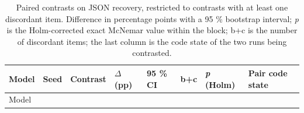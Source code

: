 \begin{landscape}
\begingroup\scriptsize\setlength{\tabcolsep}{1pt}\sloppy
\begin{longtable}[]{@{}
  >{\raggedright\arraybackslash}p{}
  >{\raggedleft\arraybackslash}p{}
  >{\raggedright\arraybackslash}p{}
  >{\raggedleft\arraybackslash}p{}
  >{\raggedright\arraybackslash}p{}
  >{\raggedleft\arraybackslash}p{}
  >{\raggedleft\arraybackslash}p{}
  >{\raggedright\arraybackslash}p{}@{}}
\caption{Paired contrasts on JSON recovery, restricted to contrasts with at least one discordant item. Difference in percentage points with a 95 \% bootstrap interval; \emph{p} is the Holm-corrected exact McNemar value within the block; b+c is the number of discordant items; the last column is the code state of the two runs being contrasted.}\tabularnewline
\toprule\noalign{}
\begin{minipage}[b]{\linewidth}\raggedright
Model
\end{minipage} & \begin{minipage}[b]{\linewidth}\raggedleft
Seed
\end{minipage} & \begin{minipage}[b]{\linewidth}\raggedright
Contrast
\end{minipage} & \begin{minipage}[b]{\linewidth}\raggedleft
\(\Delta\) (pp)
\end{minipage} & \begin{minipage}[b]{\linewidth}\raggedright
95 \% CI
\end{minipage} & \begin{minipage}[b]{\linewidth}\raggedleft
b+c
\end{minipage} & \begin{minipage}[b]{\linewidth}\raggedleft
\emph{p} (Holm)
\end{minipage} & \begin{minipage}[b]{\linewidth}\raggedright
Pair code state
\end{minipage} \\
\midrule\noalign{}
\endfirsthead
\toprule\noalign{}
\begin{minipage}[b]{\linewidth}\raggedright
Model
\end{minipage} & \begin{minipage}[b]{\linewidth}\raggedleft

\end{minipage}
\end{longtable}
\end{landscape}
